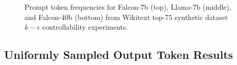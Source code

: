 \documentclass{article} %
\begin{document}
\begin{figure}[htbp]
    \centering
    \caption{Prompt token frequencies for Falcon-7b (top), Llama-7b (middle), and Falcon-40b (bottom) from Wikitext top-75 synthetic dataset $k-\epsilon$ controllability experiments.}
    \label{fig:75_freqs}
\end{figure}












\subsection{Uniformly Sampled Output Token Results}
\label{sec:sup_deep}
\end{document}
